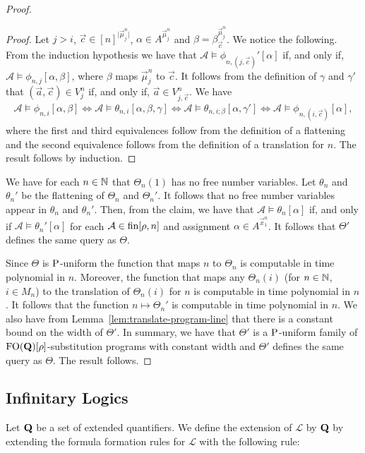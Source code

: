 \documentclass[../main/thesis.tex]{subfiles}
\begin{document}
\begin{proof}
\begin{proof}
    Let $j > i$, $\vec{c}\in [n]^{\vert \vec{\mu}^n_j \vert}$, $\alpha \in
    A^{\vec{\mu}^n_j}$ and $\beta = \beta^{\vec{\mu}^n_j}_{\vec{c}}$. We notice
    the following. From the induction hypothesis we have that $\mathcal{A}
    \models \phi_{n, (j, \vec{c})}' [\alpha]$ if, and only if, $\mathcal{A}
    \models \phi_{n, j}[\alpha, \beta]$, where $\beta$ maps $\vec{\mu}^n_j$ to
    $\vec{c}$. It follows from the definition of $\gamma$ and $\gamma'$ that
    $(\vec{a}, \vec{c}) \in V^n_{j}$ if, and only if, $\vec{a} \in V^n_{j,
      \vec{c}}$. We have
    \begin{align*}
      \mathcal{A} \models \phi_{n, i} [\alpha, \beta] \iff \mathcal{A} \models \theta_{n, i}[\alpha, \beta, \gamma] \iff \mathcal{A} \models \theta_{n, i ; \beta}[\alpha, \gamma'] \iff \mathcal{A} \models \phi_{n, (i, \vec{c})}[\alpha],
    \end{align*}
    where the first and third equivalences follow from the definition of a
    flattening and the second equivalence follows from the definition of a
    translation for $n$. The result follows by induction.
  \end{proof}

  We have for each $n \in \mathbb{N}$ that $\Theta_n(1)$ has no free number
  variables. Let $\theta_n$ and $\theta_n'$ be the flattening of $\Theta_n$ and
  $\Theta_n'$. It follows that no free number variables appear in $\theta_n$ and
  $\theta_n'$. Then, from the claim, we have that $\mathcal{A} \models
  \theta_n[\alpha]$ if, and only if $\mathcal{A} \models \theta_n'[\alpha]$ for
  each $\mathcal{A} \in \text{\upshape fin}[\rho, n]$ and assignment $\alpha \in
  A^{\vec{x}^n_1}$. It follows that $\Theta'$ defines the same query as
  $\Theta$.

  Since $\Theta$ is $\mathrm{P}$-uniform the function that maps $n$ to $\Theta_n$ is
  computable in time polynomial in $n$. Moreover, the function that maps any
  $\Theta_n(i)$ (for $n \in \mathbb{N}$, $i \in M_n$) to the translation of
  $\Theta_n(i)$ for $n$ is computable in time polynomial in $n$. It follows that
  the function $n \mapsto \Theta_n'$ is computable in time polynomial in $n$. We
  also have from Lemma~\ref{lem:translate-program-line} that there is a constant
  bound on the width of $\Theta'$. In summary, we have that $\Theta'$ is a
  $\mathrm{P}$-uniform family of $\text{\upshape FO}(\mathbf{Q})[\rho]$-substitution programs with
  constant width and $\Theta'$ defines the same query as $\Theta$. The result
  follows.
\end{proof}

\subsection{Infinitary Logics}
Let $\mathbf{Q}$ be a set of extended quantifiers. We define the extension of
$\mathcal{L}$ by $\mathbf{Q}$ by extending the formula formation rules for
$\mathcal{L}$ with the following rule:
\end{document}
